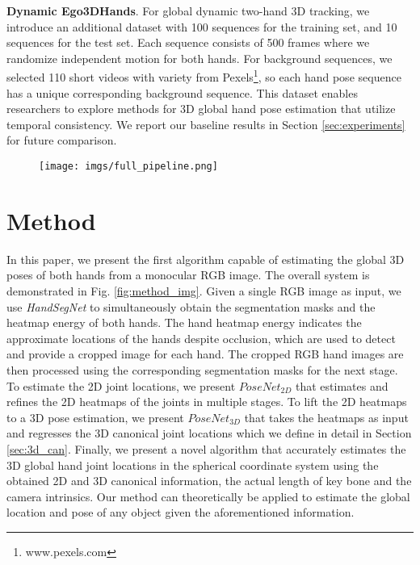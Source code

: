 \documentclass[10pt,twocolumn,letterpaper]{article}
\begin{document}
\noindent\textbf{Dynamic Ego3DHands}. For global dynamic two-hand 3D tracking, we introduce an additional dataset with 100 sequences for the training set, and 10 sequences for the test set. Each sequence consists of 500 frames where we randomize independent motion for both hands. For background sequences, we selected 110 short videos with variety from Pexels\footnote{www.pexels.com}, so each hand pose sequence has a unique corresponding background sequence. This dataset enables researchers to explore methods for 3D global hand pose estimation that utilize temporal consistency. We report our baseline results in Section \ref{sec:experiments} for future comparison.
\begin{figure*}[t!]
  \centering
  \begin{subfigure}[b]{1.0\linewidth}
    \texttt{[image: imgs/full\_pipeline.png]}
  \end{subfigure}
  \caption{Overview of proposed pipeline for two-hand global pose estimation from monocular RGB. Given a RGB image, we segment and detect the hands, crop and process the hand images for 2D canonical pose estimation despite inter-hand occlusion, and use the 2D heatmaps to estimate 3D canonical poses. For the final step, We introduce a novel algorithm for computing the 3D global hand poses using the 2D and 3D canonical estimation as well as the actual bone lengths.}
  \label{fig:method_img}
\end{figure*}
\section{Method}
\indent In this paper, we present the first algorithm capable of estimating the global 3D poses of both hands from a monocular RGB image. The overall system is demonstrated in Fig. \ref{fig:method_img}. Given a single RGB image as input, we use \textit{HandSegNet} to simultaneously obtain the segmentation masks and the heatmap energy of both hands. The hand heatmap energy indicates the approximate locations of the hands despite occlusion, which are used to detect and provide a cropped image for each hand. The cropped RGB hand images are then processed using the corresponding segmentation masks for the next stage. To estimate the 2D joint locations, we present \textit{$PoseNet_{2D}$} that estimates and refines the 2D heatmaps of the joints in multiple stages. To lift the 2D heatmaps to a 3D pose estimation, we present \textit{$PoseNet_{3D}$} that takes the heatmaps as input and regresses the 3D canonical joint locations which we define in detail in Section \ref{sec:3d_can}. Finally, we present a novel algorithm that accurately estimates the 3D global hand joint locations in the spherical coordinate system using the obtained 2D and 3D canonical information, the actual length of key bone and the camera intrinsics. Our method can theoretically be applied to estimate the global location and pose of any object given the aforementioned information.
\end{document}
